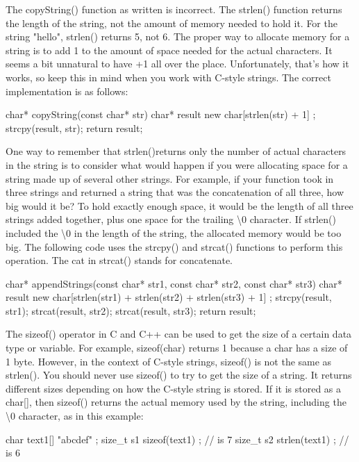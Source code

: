 The copyString() function as written is incorrect. The strlen() function returns the length of the string, not the amount of memory needed to hold it. For the string "hello", strlen() returns 5, not 6. The proper way to allocate memory for a string is to add 1 to the amount of space needed for the actual characters. It seems a bit unnatural to have +1 all over the place. Unfortunately, that’s how it works, so keep this in mind when you work with C-style strings. The correct implementation is as follows:

\begin{cpp}
char* copyString(const char* str)
{
    char* result { new char[strlen(str) + 1] };
    strcpy(result, str);
    return result;
}
\end{cpp}

One way to remember that strlen()returns only the number of actual characters in the string is to consider what would happen if you were allocating space for a string made up of several other strings. For example, if your function took in three strings and returned a string that was the concatenation of all three, how big would it be? To hold exactly enough space, it would be the length of all three strings added together, plus one space for the trailing \textbackslash{}0 character. If strlen() included the \textbackslash{}0 in the length of the string, the allocated memory would be too big. The following code uses the strcpy() and strcat() functions to perform this operation. The cat in strcat() stands for concatenate.

\begin{cpp}
char* appendStrings(const char* str1, const char* str2, const char* str3)
{
    char* result { new char[strlen(str1) + strlen(str2) + strlen(str3) + 1] };
    strcpy(result, str1);
    strcat(result, str2);
    strcat(result, str3);
    return result;
}
\end{cpp}

The sizeof() operator in C and C++ can be used to get the size of a certain data type or variable. For example, sizeof(char) returns 1 because a char has a size of 1 byte. However, in the context of C-style strings, sizeof() is not the same as strlen(). You should never use sizeof() to try to get the size of a string. It returns different sizes depending on how the C-style string is stored. If it is stored as a char[], then sizeof() returns the actual memory used by the string, including the \textbackslash{}0 character, as in this example:

\begin{cpp}
char text1[] { "abcdef" };
size_t s1 { sizeof(text1) }; // is 7
size_t s2 { strlen(text1) }; // is 6
\end{cpp}

